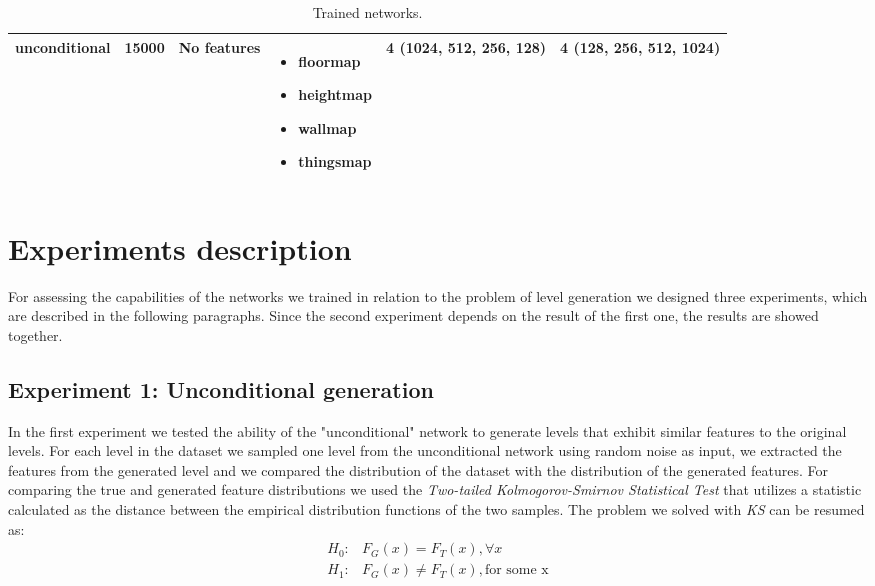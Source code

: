 \begin{table}[h!]
\begin{tabularx}{\textwidth}{| c | c | X | X | X | X |}
		\hline
		
		unconditional & 15000 & 
		No features
		& 
		\begin{itemize}
			\raggedright
			\small
			\item[] floormap
			\item[] heightmap
			\item[] wallmap
			\item[] thingsmap
		\end{itemize}
		& 4 (1024, 512, 256, 128) & 4 (128, 256, 512, 1024)\\
		
		\hline
	
		
	\end{tabularx}
	\caption[ Trained Models ]{ Trained networks. }
	\label{tab:trained_models}
\end{table}	

\section{Experiments description}
For assessing the capabilities of the networks we trained in relation to the problem of level generation we designed three experiments, which are described in the following paragraphs. Since the second experiment depends on the result of the first one, the results are showed together.

\subsection{Experiment 1: Unconditional generation}
In the first experiment we tested the ability of the "unconditional" network to generate levels that exhibit similar features to the original levels. 
For each level in the dataset we sampled one level from the unconditional network using random noise as input, we extracted the features from the generated level and we compared the distribution of the dataset with the distribution of the generated features. For comparing the true and generated feature distributions we used the \textit{Two-tailed Kolmogorov-Smirnov Statistical Test} \cite{KS-test} that utilizes a statistic calculated as the distance  between the empirical distribution functions of the two samples. The problem we solved with \textit{KS} can be resumed as: \\

\begin{equation}
	\begin{split}
	H_{0}:  & F_{G}(x) = F_{T}(x), \forall x \\
	H_{1}:  & F_{G}(x) \neq F_{T}(x), \text{for some x} \\
	\end{split}
\end{equation}

